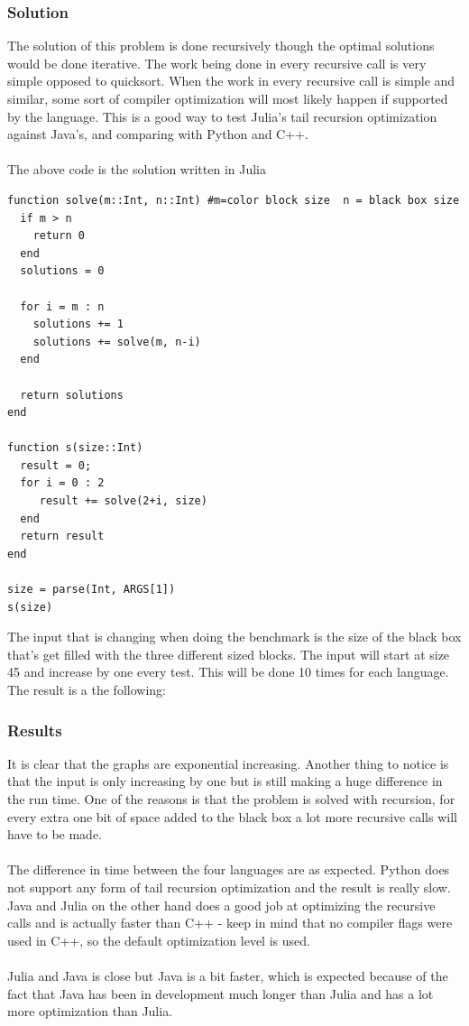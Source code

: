 \documentclass[a4paper, 11pt, titlepage]{article}
\begin{document}
\subsubsection{Solution}
The solution of this problem is done recursively though the optimal solutions would be done iterative. The work being done in every recursive call is very simple opposed to quicksort. When the work in every recursive call is simple and similar, some sort of compiler optimization will most likely happen if supported by the language. This is a good way to test Julia’s tail recursion optimization against Java's, and comparing with Python and C++.\\
\\
The above code is the solution written in Julia
\begin{lstlisting}
function solve(m::Int, n::Int) #m=color block size  n = black box size
  if m > n
    return 0
  end
  solutions = 0

  for i = m : n
    solutions += 1
    solutions += solve(m, n-i)
  end

  return solutions
end

function s(size::Int)
  result = 0;
  for i = 0 : 2
     result += solve(2+i, size)
  end
  return result
end

size = parse(Int, ARGS[1])
s(size)
\end{lstlisting}
The input that is changing when doing the benchmark is the size of the black box that's get filled with the three different sized blocks. The input will start at size 45 and increase by one every test. This will be done 10 times for each language. The result is a the following:
\subsubsection{Results}
It is clear that the graphs are exponential increasing. Another thing to notice is that the input is only increasing by one but is still making a huge difference in the run time. One of the reasons is that the problem is solved with recursion, for every extra one bit of space added to the black box a lot more recursive calls will have to be made.\\
\\
The difference in time between the four languages are as expected. Python does not support any form of tail recursion optimization and the result is really slow. Java and Julia on the other hand does a good job at optimizing the recursive calls and is actually faster than C++ - keep in mind that no compiler flags were used in C++, so the default optimization level is used.\\
\\
Julia and Java is close but Java is a bit faster, which is expected because of the fact that Java has been in development much longer than Julia and has a lot more optimization than Julia.
\end{document}
